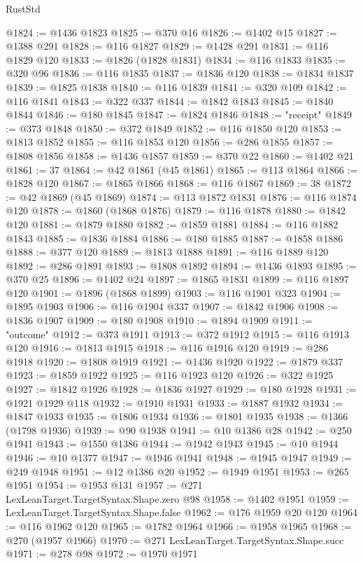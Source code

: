 \begin{lexlean}{RustStd}
\begin{coremodule}
@1824 := @1436 @1823
@1825 := @370 @16
@1826 := @1402 @15
@1827 := @1388 @291
@1828 := @116 @1827
@1829 := @1428 @291
@1831 := @116 @1829 @120
@1833 := @1826 (@1828 @1831)
@1834 := @116 @1833
@1835 := @320 @96
@1836 := @116 @1835
@1837 := @1836 @120
@1838 := @1834 @1837
@1839 := @1825 @1838
@1840 := @116 @1839
@1841 := @320 @109
@1842 := @116 @1841
@1843 := @322 @337
@1844 := @1842 @1843
@1845 := @1840 @1844
@1846 := @180 @1845
@1847 := @1824 @1846
@1848 := "receipt"
@1849 := @373 @1848
@1850 := @372 @1849
@1852 := @116 @1850 @120
@1853 := @1813 @1852
@1855 := @116 @1853 @120
@1856 := @286 @1855
@1857 := @1808 @1856
@1858 := @1436 @1857
@1859 := @370 @22
@1860 := @1402 @21
@1861 := 37
@1864 := @42 @1861 (@45 @1861)
@1865 := @113 @1864
@1866 := @1828 @120
@1867 := @1865 @1866
@1868 := @116 @1867
@1869 := 38
@1872 := @42 @1869 (@45 @1869)
@1874 := @113 @1872 @1831
@1876 := @116 @1874 @120
@1878 := @1860 (@1868 @1876)
@1879 := @116 @1878
@1880 := @1842 @120
@1881 := @1879 @1880
@1882 := @1859 @1881
@1884 := @116 @1882 @1843
@1885 := @1836 @1884
@1886 := @180 @1885
@1887 := @1858 @1886
@1888 := @377 @120
@1889 := @1813 @1888
@1891 := @116 @1889 @120
@1892 := @286 @1891
@1893 := @1808 @1892
@1894 := @1436 @1893
@1895 := @370 @25
@1896 := @1402 @24
@1897 := @1865 @1831
@1899 := @116 @1897 @120
@1901 := @1896 (@1868 @1899)
@1903 := @116 @1901 @323
@1904 := @1895 @1903
@1906 := @116 @1904 @337
@1907 := @1842 @1906
@1908 := @1836 @1907
@1909 := @180 @1908
@1910 := @1894 @1909
@1911 := "outcome"
@1912 := @373 @1911
@1913 := @372 @1912
@1915 := @116 @1913 @120
@1916 := @1813 @1915
@1918 := @116 @1916 @120
@1919 := @286 @1918
@1920 := @1808 @1919
@1921 := @1436 @1920
@1922 := @1879 @337
@1923 := @1859 @1922
@1925 := @116 @1923 @120
@1926 := @322 @1925
@1927 := @1842 @1926
@1928 := @1836 @1927
@1929 := @180 @1928
@1931 := @1921 @1929 @118
@1932 := @1910 @1931
@1933 := @1887 @1932
@1934 := @1847 @1933
@1935 := @1806 @1934
@1936 := @1801 @1935
@1938 := @1366 (@1798 @1936)
@1939 := @90 @1938
@1941 := @10 @1386 @28
@1942 := @250 @1941
@1943 := @1550 @1386
@1944 := @1942 @1943
@1945 := @10 @1944
@1946 := @10 @1377
@1947 := @1946 @1941
@1948 := @1945 @1947
@1949 := @249 @1948
@1951 := @12 @1386 @20
@1952 := @1949 @1951
@1953 := @265 @1951
@1954 := @1953 @131
@1957 := @271 LexLeanTarget.TargetSyntax.Shape.zero @98
@1958 := @1402 @1951
@1959 := LexLeanTarget.TargetSyntax.Shape.false
@1962 := @176 @1959 @20 @120
@1964 := @116 @1962 @120
@1965 := @1782 @1964
@1966 := @1958 @1965
@1968 := @270 (@1957 @1966)
@1970 := @271 LexLeanTarget.TargetSyntax.Shape.succ
@1971 := @278 @98
@1972 := @1970 @1971

\end{coremodule}
\end{lexlean}
